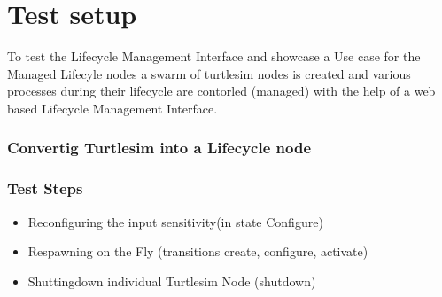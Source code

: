 		
	
\chapter{Test setup}	

To test the Lifecycle Management Interface and showcase a Use case for the Managed Lifecyle nodes a swarm of turtlesim nodes is created and various processes during their lifecycle are contorled (managed) with the help of a web based Lifecycle Management Interface. 
\subsection{Convertig Turtlesim into a Lifecycle node}

\subsection{Test Steps}
\begin{itemize}
	\item Reconfiguring the input sensitivity(in state Configure)
	\item Respawning on the Fly (transitions create, configure, activate)
	\item Shuttingdown individual Turtlesim Node (shutdown)
\end{itemize}